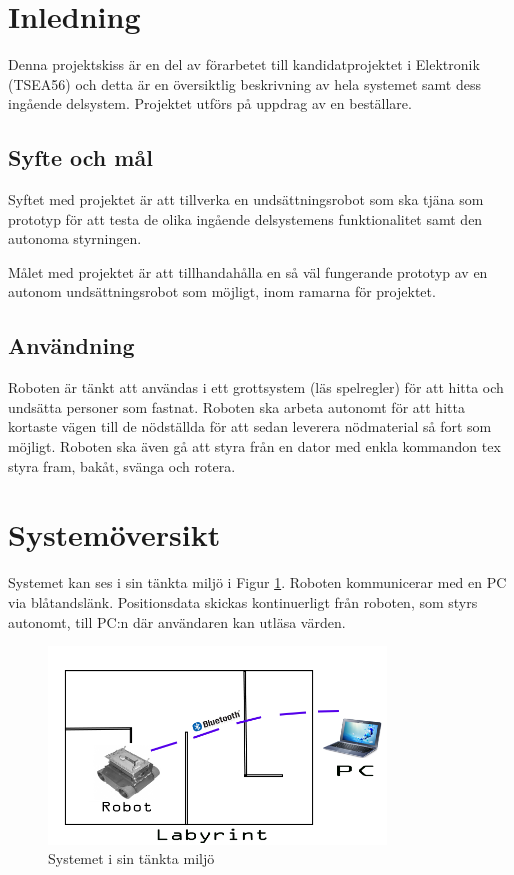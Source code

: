 \documentclass[11pt]{article}
\begin{document}
\begin{flushleft}

\section{Inledning}
Denna projektskiss är en del av förarbetet till kandidatprojektet i Elektronik (TSEA56) och detta är en översiktlig beskrivning av hela systemet samt dess ingående delsystem. Projektet utförs på uppdrag av en beställare. 

\subsection{Syfte och mål}
Syftet med projektet är att tillverka en undsättningsrobot som ska tjäna som prototyp för att testa de olika ingående delsystemens funktionalitet samt den autonoma styrningen. 

Målet med projektet är att tillhandahålla en så väl fungerande prototyp av en autonom undsättningsrobot som möjligt, inom ramarna för projektet.


\subsection{Användning}
Roboten är tänkt att användas i ett grottsystem (läs spelregler) för att hitta och undsätta personer som fastnat. Roboten ska arbeta autonomt för att hitta kortaste vägen till de nödställda för att sedan leverera nödmaterial så fort som möjligt. Roboten ska även gå att styra från en dator med enkla kommandon tex styra fram, bakåt, svänga och rotera.



\section{Systemöversikt}
Systemet kan ses i sin tänkta miljö i Figur  \ref{figure:Systemöversikt}.
Roboten kommunicerar med en PC via blåtandslänk. Positionsdata skickas kontinuerligt från roboten, som styrs autonomt, till PC:n där användaren kan utläsa värden.

\begin{figure}[H]
\centering
\includegraphics[width=0.8\textwidth]{system_omgivning}
\caption{Systemet i sin tänkta miljö}
\label{figure:Systemöversikt}
\end{figure}


\end{flushleft}
\end{document}
